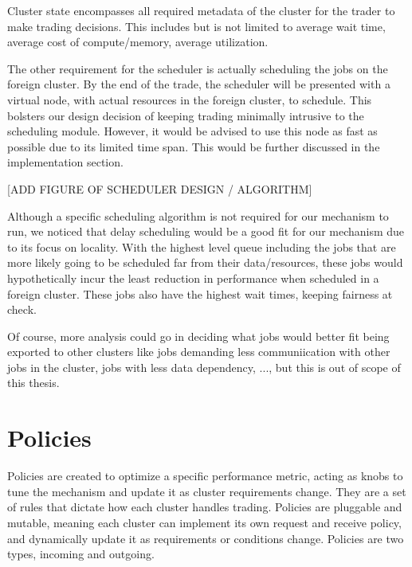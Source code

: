 Cluster state encompasses all required metadata of the cluster for the trader
to make trading decisions. This includes but is not limited to average wait
time, average cost of compute/memory, average utilization. 

The other requirement for the scheduler is actually scheduling the jobs on the
foreign cluster. By the end of the trade, the scheduler will be presented with
a virtual node, with actual resources in the foreign cluster, to schedule. This
bolsters our design decision of keeping trading minimally intrusive to the
scheduling module. However, it would be advised to use this node as fast as
possible due to its limited time span. This would be further discussed in the
implementation section.  

[ADD FIGURE OF SCHEDULER DESIGN / ALGORITHM]

Although a specific scheduling algorithm is not required for our mechanism to
run, we noticed that delay scheduling would be a good fit for our mechanism due
to its focus on locality. With the highest level queue including the jobs that
are more likely going to be scheduled far from their data/resources, these jobs
would hypothetically incur the least reduction in performance when scheduled in
a foreign cluster. These jobs also have the highest wait times, keeping
fairness at check. 

Of course, more analysis could go in deciding what jobs would better fit being
exported to other clusters like jobs demanding less communiication with other
jobs in the cluster, jobs with less data dependency, ..., but this is out of
scope of this thesis.


\section{Policies}

Policies are created to optimize a specific performance metric, acting as knobs
to tune the mechanism and update it as cluster requirements change. They are a
set of rules that dictate how each cluster handles trading. Policies are
pluggable and mutable, meaning each cluster can implement its own request and
receive policy, and dynamically update it as requirements or conditions change.
Policies are two types, incoming and outgoing. 

